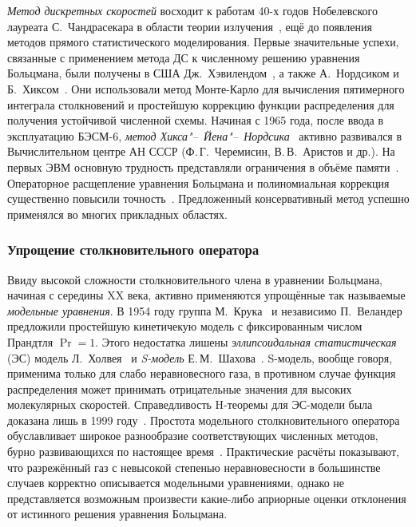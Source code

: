 \emph{Метод дискретных скоростей} восходит к работам 40-х годов Нобелевского лауреата С.~Чандрасекара
в области теории излучения~\cite{Chandrasekhar1950}, ещё до появления методов прямого статистического моделирования.
Первые значительные успехи, связанные с применением метода ДС к численному решению уравнения Больцмана,
были получены в США Дж.~Хэвилендом~\cite{Haviland1965, Haviland1970}, а также А.~Нордсиком и Б.~Хиксом~\cite{Nordsieck1966, Nordsieck1970}.
Они использовали метод Монте-Карло для вычисления пятимерного интеграла столкновений
и простейшую коррекцию функции распределения для получения устойчивой численной схемы.
Начиная с 1965 года, после ввода в эксплуатацию БЭСМ-6, \emph{метод Хикса"--~Йена"--~Нордсика}~\cite{Nordsieck1966, Yen1984}
активно развивался в Вычислительном центре АН СССР (Ф.\,Г.~Черемисин, В.\,В.~Аристов и др.).
На первых ЭВМ основную трудность представляли ограничения в объёме памяти~\cite{Tcheremissine1970}.
Операторное расщепление уравнения Больцмана и полиномиальная коррекция существенно повысили точность~\cite{Tcheremissine1980}.
Предложенный консервативный метод успешно применялся во многих прикладных областях.

\subsubsection{Упрощение столкновительного оператора}

Ввиду высокой сложности столкновительного члена в уравнении Больцмана, начиная с середины XX века,
активно применяются упрощённые так называемые \emph{модельные уравнения}.
В 1954 году группа М.~Крука~\cite{Krook1954} и независимо П.~Веландер~\cite{Welander1954}
предложили простейшую кинетичекую модель с фиксированным числом Прандтля \(\Pr=1\).
Этого недостатка лишены \emph{эллипсоидальная статистическая} (ЭС) модель Л.~Холвея~\cite{Holway1963, Holway1966}
и \emph{S-модель} Е.\,М.~Шахова~\cite{Shakhov1968}.
S-модель, вообще говоря, применима только для слабо неравновесного газа,
в противном случае функция распределения может принимать отрицательные значения для высоких молекулярных скоростей.
Справедливость H-теоремы для ЭС-модели была доказана лишь в 1999 году~\cite{Perthame2000}.
Простота модельного столкновительного оператора обуславливает широкое разнообразие соответствующих численных методов,
бурно развивающихся по настоящее время~\cite{Dimarco2014}.
Практические расчёты показывают, что разрежённый газ с невысокой степенью неравновесности в большинстве случаев
корректно описывается модельными уравнениями, однако не представляется возможным произвести какие-либо
априорные оценки отклонения от истинного решения уравнения Больцмана.

